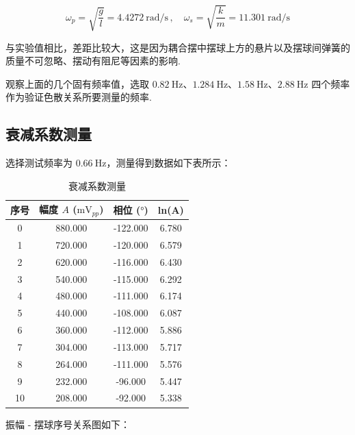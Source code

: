 \documentclass{customDoc}
\begin{document}
\begin{equation}
    \omega_p = \sqrt{\frac{g}{l}} = \SI{4.4272}{\radian\per\second}\,,\quad\omega_s = \sqrt{\frac{k}{m}} = \SI{11.301}{\radian\per\second}
\end{equation}

与实验值相比，差距比较大，这是因为耦合摆中摆球上方的悬片以及摆球间弹簧的质量不可忽略、摆动有阻尼等因素的影响.

观察上面的几个固有频率值，选取 $\SI{0.82}{\hertz}$、$\SI{1.284}{\hertz}$、$\SI{1.58}{\hertz}$、$\SI{2.88}{\hertz}$ 四个频率作为验证色散关系所要测量的频率.

\subsection{衰减系数测量}

选择测试频率为 $\SI{0.66}{\hertz}$，测量得到数据如下表所示：

\begin{table}[htbp]
  \centering
  \caption{衰减系数测量}
    \begin{tabular}{|c|c|c|c|}
    \hline
    序号    & 幅度 $A$ ($\si{\milli\volt}_{pp}$) & 相位 ($\si{\degree}$) & ln(A) \\
    \hline
    0     & 880.000 & -122.000 & 6.780 \\
    \hline
    1     & 720.000 & -120.000 & 6.579 \\
    \hline
    2     & 620.000 & -116.000 & 6.430 \\
    \hline
    3     & 540.000 & -115.000 & 6.292 \\
    \hline
    4     & 480.000 & -111.000 & 6.174 \\
    \hline
    5     & 440.000 & -108.000 & 6.087 \\
    \hline
    6     & 360.000 & -112.000 & 5.886 \\
    \hline
    7     & 304.000 & -113.000 & 5.717 \\
    \hline
    8     & 264.000 & -111.000 & 5.576 \\
    \hline
    9     & 232.000 & -96.000 & 5.447 \\
    \hline
    10    & 208.000 & -92.000 & 5.338 \\
    \hline
    \end{tabular}%
  \label{tab:addlabel}%
\end{table}%

振幅 - 摆球序号关系图如下：
\end{document}
